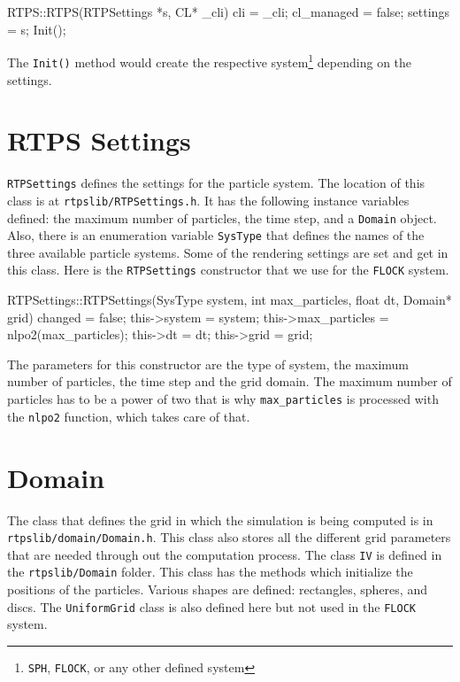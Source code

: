 \begin{cppcode}{0}
RTPS::RTPS(RTPSettings *s, CL* _cli) 
{
	cli = _cli;
 	cl_managed = false;
	settings = s;
	Init();
}
\end{cppcode}

The \texttt{Init()} method would create the respective system\footnote{\texttt{SPH}, \texttt{FLOCK}, or any other defined system} depending on the settings.

\section{RTPS Settings}\label{rtpsettings}
\texttt{RTPSettings} defines the settings for the particle system. The location of this class is at \texttt{rtpslib/RTPSettings.h}. It has the following instance variables defined: the maximum number of particles, the time step, and a \texttt{Domain} object. Also, there is an enumeration variable \texttt{SysType} that defines the names of the three available particle systems. Some of the rendering settings are set and get in this class. Here is the \texttt{RTPSettings} constructor that we use for the \texttt{FLOCK} system.

\begin{cppcode}{0}
RTPSettings::RTPSettings(SysType system, int max_particles, float dt, Domain* grid)
{
	changed = false;
	this->system = system;
	this->max_particles = nlpo2(max_particles);
	this->dt = dt;
	this->grid = grid;
}
\end{cppcode}

The parameters for this constructor are the type of system, the maximum number of particles, the time step and the grid domain. The maximum number of particles has to be a power of two that is why \texttt{max\_particles} is processed with the \texttt{nlpo2} function, which takes care of that.

\section{Domain}
The class that defines the grid in which the simulation is being computed is in \texttt{rtpslib/domain/Domain.h}. This class also stores all the different grid parameters that are needed through out the computation process. The class \texttt{IV} is defined in the \texttt{rtpslib/Domain} folder. This class has the methods which initialize the positions of the particles. Various shapes are defined: rectangles, spheres, and discs. The \texttt{UniformGrid} class is also defined here but not used in the \texttt{FLOCK} system.

